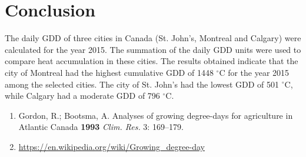 \documentclass{article}
\begin{document}
\newpage 
\section{Conclusion}
The daily GDD of three cities in Canada (St. John's, Montreal and Calgary) were calculated for the year 2015. The summation of the daily GDD units were used to compare heat accumulation in these cities. The results obtained indicate that the city of Montreal had the highest cumulative GDD of 1448 $^{\circ}$C for the year 2015 among the selected cities. The city of St. John's had the lowest GDD of 501 $^{\circ}$C, while Calgary had a moderate GDD of 796 $^{\circ}$C.


\begin{enumerate}
\item Gordon, R.; Bootsma, A. Analyses of growing degree-days for agriculture in Atlantic Canada \textbf{1993} \textit{Clim. Res.} 3: 169--179.
\item \href{url}{https://en.wikipedia.org/wiki/Growing_degree-day}
\end{enumerate}

%



\end{document}
